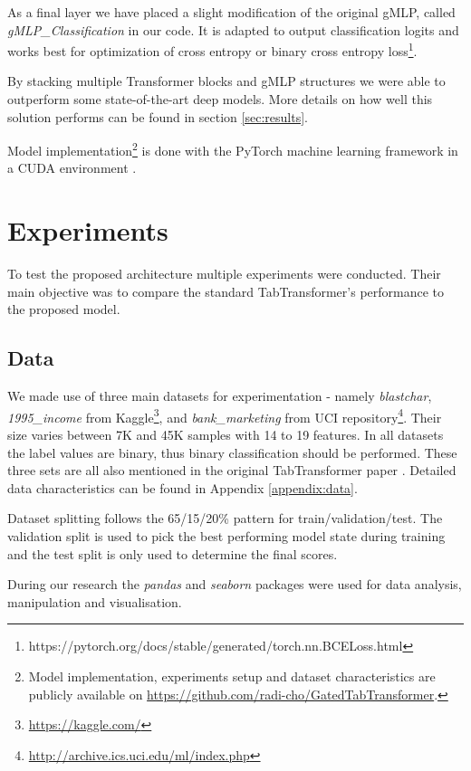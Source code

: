\documentclass{article}
\newcommand{\projectSource}{\url{https://github.com/radi-cho/GatedTabTransformer}}
\begin{document}
As a final layer we have placed a slight modification of the original gMLP, called \textit{gMLP\_Classification} in our code. It is adapted to output classification logits and works best for optimization of cross entropy or binary cross entropy loss\footnote{https://pytorch.org/docs/stable/generated/torch.nn.BCELoss.html}.

By stacking multiple Transformer blocks and gMLP structures we were able to outperform some state-of-the-art deep models. More details on how well this solution performs can be found in section \ref{sec:results}.

Model implementation\footnote{Model implementation, experiments setup and dataset characteristics are publicly available on \projectSource.} is done with the PyTorch \cite{NEURIPS2019_9015} machine learning framework in a CUDA environment \cite{cuda}.

\section{Experiments}

To test the proposed architecture multiple experiments were conducted. Their main objective was to compare the standard TabTransformer's performance to the proposed model.

\subsection{Data}

We made use of three main datasets for experimentation - namely \textit{blastchar}, \textit{1995\_income} from Kaggle\footnote{\url{https://kaggle.com/}}, and \textit{bank\_marketing} from UCI repository\footnote{\url{http://archive.ics.uci.edu/ml/index.php}}. Their size varies between 7K and 45K samples with 14 to 19 features. In all datasets the label values are binary, thus binary classification should be performed. These three sets are all also mentioned in the original TabTransformer paper \cite{Huang2020TabTransformerTD}. Detailed data characteristics can be found in Appendix \ref{appendix:data}.

Dataset splitting follows the 65/15/20\% pattern for train/validation/test. The validation split is used to pick the best performing model state during training and the test split is only used to determine the final scores.

During our research the \textit{pandas} \cite{mckinney-proc-scipy-2010} and \textit{seaborn} \cite{Waskom2021} packages were used for data analysis, manipulation and visualisation.
\end{document}

